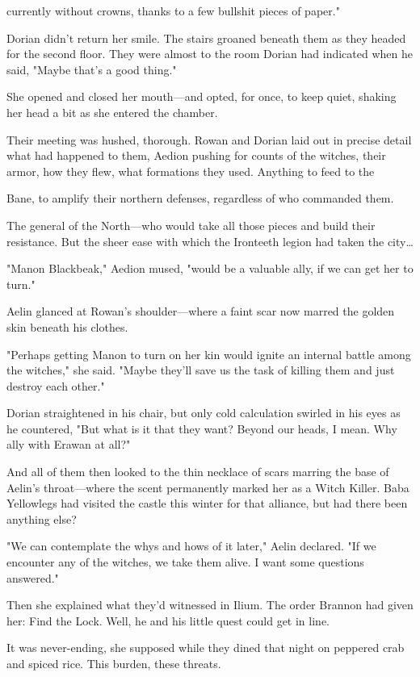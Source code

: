 currently without crowns, thanks to a few bullshit pieces of paper."

Dorian didn't return her smile. The stairs groaned beneath them as they headed for the second floor. They were almost to the room Dorian had indicated when he said, "Maybe that's a good thing."

She opened and closed her mouth---and opted, for once, to keep quiet, shaking her head a bit as she entered the chamber.

Their meeting was hushed, thorough. Rowan and Dorian laid out in precise detail what had happened to them, Aedion pushing for counts of the witches, their armor, how they flew, what formations they used. Anything to feed to the

Bane, to amplify their northern defenses, regardless of who commanded them.

The general of the North---who would take all those pieces and build their resistance. But the sheer ease with which the Ironteeth legion had taken the city\ldots{}

"Manon Blackbeak," Aedion mused, "would be a valuable ally, if we can get her to turn."

Aelin glanced at Rowan's shoulder---where a faint scar now marred the golden skin beneath his clothes.

"Perhaps getting Manon to turn on her kin would ignite an internal battle among the witches," she said. "Maybe they'll save us the task of killing them and just destroy each other."

Dorian straightened in his chair, but only cold calculation swirled in his eyes as he countered, "But what is it that they want? Beyond our heads, I mean. Why ally with Erawan at all?"

And all of them then looked to the thin necklace of scars marring the base of Aelin's throat---where the scent permanently marked her as a Witch Killer. Baba Yellowlegs had visited the castle this winter for that alliance, but had there been anything else?

"We can contemplate the whys and hows of it later," Aelin declared. "If we encounter any of the witches, we take them alive. I want some questions answered."

Then she explained what they'd witnessed in Ilium. The order Brannon had given her: Find the Lock. Well, he and his little quest could get in line.

It was never-ending, she supposed while they dined that night on peppered crab and spiced rice. This burden, these threats.

